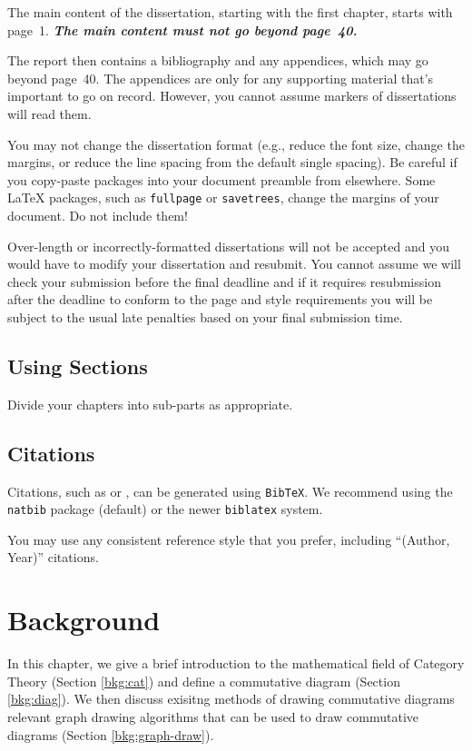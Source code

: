 \documentclass[logo,bsc,singlespacing,parskip]{infthesis}
\theoremstyle{definition}
\begin{document}
The main content of the dissertation, starting with the first chapter,
starts with page~1. \emph{\textbf{The main content must not go beyond page~40.}}

The report then contains a bibliography and any appendices, which may go beyond
page~40. The appendices are only for any supporting material that's important to
go on record. However, you cannot assume markers of dissertations will read them.

You may not change the dissertation format (e.g., reduce the font size, change
the margins, or reduce the line spacing from the default single spacing). Be
careful if you copy-paste packages into your document preamble from elsewhere.
Some \LaTeX{} packages, such as \texttt{fullpage} or \texttt{savetrees}, change
the margins of your document. Do not include them!

Over-length or incorrectly-formatted dissertations will not be accepted and you
would have to modify your dissertation and resubmit. You cannot assume we will
check your submission before the final deadline and if it requires resubmission
after the deadline to conform to the page and style requirements you will be
subject to the usual late penalties based on your final submission time.

\section{Using Sections}

Divide your chapters into sub-parts as appropriate.

\section{Citations}

Citations, such as \autocite{P1} or \autocite{P2}, can be generated using
\texttt{BibTeX}. We recommend using the \texttt{natbib} package (default) or the newer \texttt{biblatex} system. 

You may use any consistent reference style that you prefer, including ``(Author, Year)'' citations. 

\chapter{Background}
In this chapter, we give a brief introduction to the mathematical field of Category Theory (Section \ref{bkg:cat}) and define a commutative diagram (Section \ref{bkg:diag}). We then discuss exisitng methods of drawing commutative diagrams  relevant graph drawing algorithms that can be used to draw commutative diagrams (Section \ref{bkg:graph-draw}).
\end{document}
